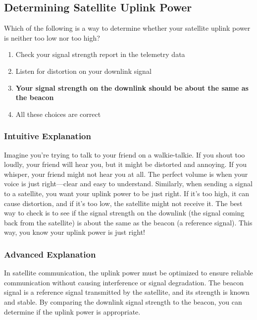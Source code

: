 \subsection{Determining Satellite Uplink Power}
\label{T8B12}

\begin{tcolorbox}[colback=gray!10!white,colframe=black!75!black,title=T8B12]
Which of the following is a way to determine whether your satellite uplink power is neither too low nor too high?
\begin{enumerate}[label=\Alph*.]
    \item Check your signal strength report in the telemetry data
    \item Listen for distortion on your downlink signal
    \item \textbf{Your signal strength on the downlink should be about the same as the beacon}
    \item All these choices are correct
\end{enumerate}
\end{tcolorbox}

\subsubsection{Intuitive Explanation}
Imagine you're trying to talk to your friend on a walkie-talkie. If you shout too loudly, your friend will hear you, but it might be distorted and annoying. If you whisper, your friend might not hear you at all. The perfect volume is when your voice is just right—clear and easy to understand. Similarly, when sending a signal to a satellite, you want your uplink power to be just right. If it's too high, it can cause distortion, and if it's too low, the satellite might not receive it. The best way to check is to see if the signal strength on the downlink (the signal coming back from the satellite) is about the same as the beacon (a reference signal). This way, you know your uplink power is just right!

\subsubsection{Advanced Explanation}
In satellite communication, the uplink power must be optimized to ensure reliable communication without causing interference or signal degradation. The beacon signal is a reference signal transmitted by the satellite, and its strength is known and stable. By comparing the downlink signal strength to the beacon, you can determine if the uplink power is appropriate. 

